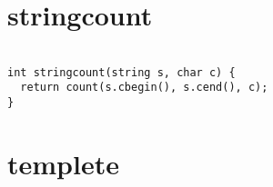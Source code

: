 \documentclass[a4j,titlepage]{jarticle} %
\begin{document}
\color{white}
\section{stringcount}
\color{black}
\begin{lstlisting}[caption=stringcount]

int stringcount(string s, char c) {
  return count(s.cbegin(), s.cend(), c);
}

\end{lstlisting}

\color{white}
\section{templete}
\color{black}
\begin{lstlisting}[caption=templete]


\end{lstlisting}
\end{document}
